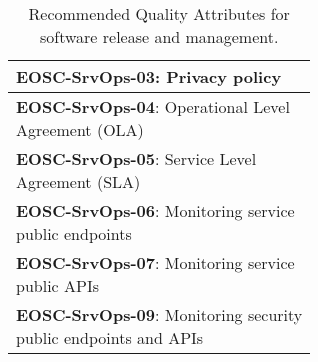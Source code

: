 \begin{table}[h]
\begin{tabular}{|p{0.6\linewidth}|}
        \textbf{EOSC-SrvOps-03}: Privacy policy \\ \hline
        \textbf{EOSC-SrvOps-04}: Operational Level Agreement (OLA) \\ \hline
        \textbf{EOSC-SrvOps-05}: Service Level Agreement (SLA) \\ \hline
        \textbf{EOSC-SrvOps-06}: Monitoring service public endpoints \\ \hline
        \textbf{EOSC-SrvOps-07}: Monitoring service public APIs \\ \hline
        \textbf{EOSC-SrvOps-09}: Monitoring security public endpoints and APIs \\ \hline

    \end{tabular}
    \caption{Recommended Quality Attributes for software release and management.}
    \label{tab:rs_serviceprod}
\end{table}





